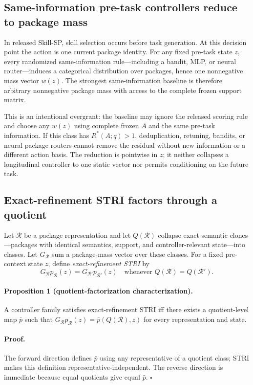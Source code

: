 \subsection{Same-information pre-task controllers reduce to package mass}
In released Skill-SP, skill selection occurs before task generation. At this decision point the action is one current package identity. For any fixed pre-task state $z$, every randomized same-information rule---including a bandit, MLP, or neural router---induces a categorical distribution over packages, hence one nonnegative mass vector $w(z)$. The strongest same-information baseline is therefore arbitrary nonnegative package mass with access to the complete frozen support matrix.

This is an intentional overgrant: the baseline may ignore the released scoring rule and choose any $w(z)$ using complete frozen $A$ and the same pre-task information. If this class has $R^*(A;q)>1$, deduplication, retuning, bandits, or neural package routers cannot remove the residual without new information or a different action basis. The reduction is pointwise in $z$; it neither collapses a longitudinal controller to one static vector nor permits conditioning on the future task.

\subsection{Exact-refinement STRI factors through a quotient}
Let $\mathcal R$ be a package representation and let $Q(\mathcal R)$ collapse exact semantic clones---packages with identical semantics, support, and controller-relevant state---into classes. Let $G_{\mathcal R}$ sum a package-mass vector over these classes. For a fixed pre-context state $z$, define \emph{exact-refinement STRI} by
\[
G_{\mathcal R}p_{\mathcal R}(z)=G_{\mathcal R'}p_{\mathcal R'}(z)
\quad\text{whenever }Q(\mathcal R)=Q(\mathcal R').
\]
\paragraph{Proposition 1 (quotient-factorization characterization).}
A controller family satisfies exact-refinement STRI iff there exists a quotient-level map $\bar p$ such that $G_{\mathcal R}p_{\mathcal R}(z)=\bar p(Q(\mathcal R),z)$ for every representation and state.
\paragraph{Proof.}
The forward direction defines $\bar p$ using any representative of a quotient class; STRI makes this definition representative-independent. The reverse direction is immediate because equal quotients give equal $\bar p$. \hfill$\square$

